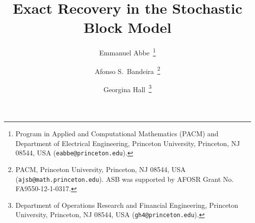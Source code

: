 \documentclass[english]{article}
\newcommand{\1}{\textbf{1}}
\begin{document}
\title{Exact Recovery in the Stochastic Block Model}

\author{Emmanuel Abbe~\thanks{Program in Applied and Computational Mathematics (PACM) and Department of Electrical Engineering, Princeton University, Princeton, NJ 08544, USA ({\tt eabbe@princeton.edu}).}
\and
Afonso S.~Bandeira~\thanks{PACM, Princeton University, Princeton, NJ 08544, USA ({\tt ajsb@math.princeton.edu}). ASB was supported by AFOSR Grant No. FA9550-12-1-0317.}
\and
Georgina Hall~\thanks{Department of Operations Research and Financial Engineering, Princeton University, Princeton, NJ 08544, USA ({\tt gh4@princeton.edu}).}
}

% 
% 

\date{}




\maketitle
\end{document}
